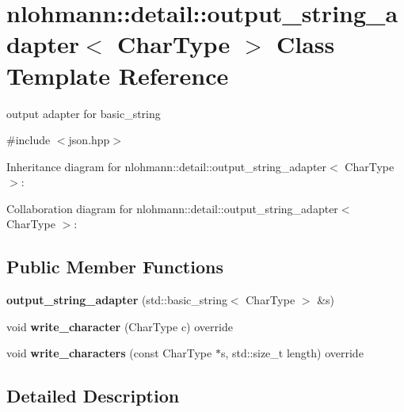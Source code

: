 \hypertarget{classnlohmann_1_1detail_1_1output__string__adapter}{}\section{nlohmann\+:\+:detail\+:\+:output\+\_\+string\+\_\+adapter$<$ Char\+Type $>$ Class Template Reference}
\label{classnlohmann_1_1detail_1_1output__string__adapter}


output adapter for basic\+\_\+string  




{\ttfamily \#include $<$json.\+hpp$>$}



Inheritance diagram for nlohmann\+:\+:detail\+:\+:output\+\_\+string\+\_\+adapter$<$ Char\+Type $>$\+:


Collaboration diagram for nlohmann\+:\+:detail\+:\+:output\+\_\+string\+\_\+adapter$<$ Char\+Type $>$\+:
\subsection*{Public Member Functions}
\begin{DoxyCompactItemize}
\item 
{\bfseries output\+\_\+string\+\_\+adapter} (std\+::basic\+\_\+string$<$ Char\+Type $>$ \&s)\hypertarget{classnlohmann_1_1detail_1_1output__string__adapter_a2086c9bd140c2ef28775fe190684fd68}{}\label{classnlohmann_1_1detail_1_1output__string__adapter_a2086c9bd140c2ef28775fe190684fd68}

\item 
void {\bfseries write\+\_\+character} (Char\+Type c) override\hypertarget{classnlohmann_1_1detail_1_1output__string__adapter_ae66b8b2b776acd4fc20bcb24dc7a4fac}{}\label{classnlohmann_1_1detail_1_1output__string__adapter_ae66b8b2b776acd4fc20bcb24dc7a4fac}

\item 
void {\bfseries write\+\_\+characters} (const Char\+Type $\ast$s, std\+::size\+\_\+t length) override\hypertarget{classnlohmann_1_1detail_1_1output__string__adapter_ad356f6e878ee105e72e66d18b665f623}{}\label{classnlohmann_1_1detail_1_1output__string__adapter_ad356f6e878ee105e72e66d18b665f623}

\end{DoxyCompactItemize}


\subsection{Detailed Description}
